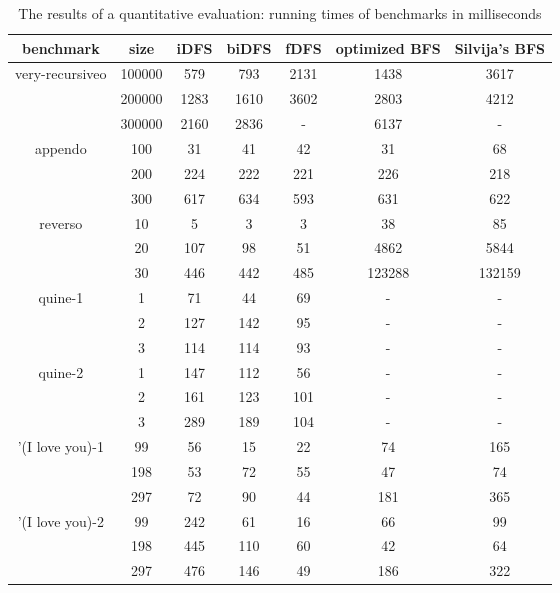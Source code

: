 \documentclass[format=acmlarge, review=true, authordraft=true]{acmart}
\begin{document}
\begin{table}
	\begin{tabular}{|c|c|c|c|c|c|c|}
		\hline 
		benchmark & size & iDFS & biDFS & fDFS & optimized BFS & Silvija's BFS  
		\\
		\hline
		very-recursiveo & 100000 &  579 &  793 & 2131 & 1438 & 3617 \\
		& 200000 & 1283 & 1610 & 3602 & 2803 & 4212 \\
		& 300000 & 2160 & 2836 &    - & 6137 &    - \\
		\hline 
		appendo  & 100 &  31 &  41 &  42 &  31 &  68 \\ 
		& 200 & 224 & 222 & 221 & 226 & 218 \\ 
		& 300 & 617 & 634 & 593 & 631 & 622 \\ 
		\hline 
		reverso & 10 &   5 &   3 &   3 &     38 &     85 \\ 
		& 20 & 107 &  98 &  51 &   4862 &   5844 \\
		& 30 & 446 & 442 & 485 & 123288 & 132159 \\ 
		\hline
		quine-1 & 1 &  71 &  44 & 69 & - & - \\ 
		& 2 & 127 & 142 & 95 & - & - \\ 
		& 3 & 114 & 114 & 93 & - & - \\ 
		\hline
		quine-2 & 1 & 147 & 112 &  56 & - & - \\ 
		& 2 & 161 & 123 & 101 & - & - \\ 
		& 3 & 289 & 189 & 104 & - & - \\ 
		\hline 
		'(I love you)-1 &  99 & 56 & 15 & 22 &  74 & 165 \\ 
		& 198 & 53 & 72 & 55 &  47 &  74 \\
		& 297 & 72 & 90 & 44 & 181 & 365 \\ 
		\hline
		'(I love you)-2 &  99 & 242 &  61 & 16 &  66 &  99 \\ 
		& 198 & 445 & 110 & 60 &  42 &  64 \\
		& 297 & 476 & 146 & 49 & 186 & 322 \\ 
		\hline 
	\end{tabular}
	\caption{The results of a quantitative evaluation: running times of 
	benchmarks 
		in milliseconds}
	\label{compare-efficiency}
\end{table}
\end{document}

